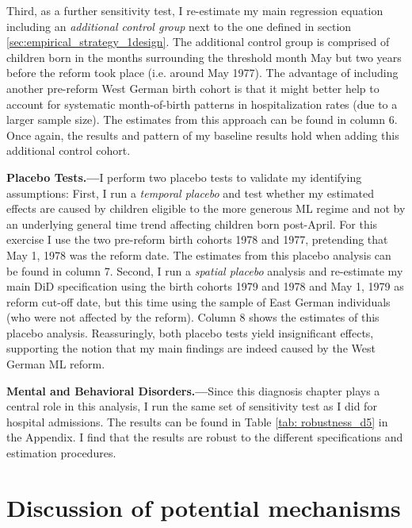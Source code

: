 \documentclass[11pt, a4paper, draft]{article} %
\begin{document}
Third, as a further sensitivity test, I re-estimate my main regression equation including an \textit{additional control group} next to the one defined in section \ref{sec:empirical_strategy_1design}. The additional control group is comprised of children born in the months surrounding the threshold month May but two years before the reform took place (i.e. around May 1977). The advantage of including another pre-reform West German birth cohort is that it might better help to account for systematic month-of-birth patterns in hospitalization rates (due to a larger sample size). The estimates from this approach can be found in column 6. Once again, the results and pattern of my baseline results hold when adding this additional control cohort.\newline


\textbf{Placebo Tests.---}I perform two placebo tests to validate my identifying assumptions: First, I run a \textit{temporal placebo} and test whether my estimated effects are caused by children eligible to the more generous ML regime and not by an underlying general time trend affecting children born post-April. For this exercise I use the two pre-reform birth cohorts 1978 and 1977, pretending that May 1, 1978 was the reform date. The estimates from this placebo analysis can be found in column 7. Second, I run a \textit{spatial placebo} analysis and re-estimate my main DiD specification using the birth cohorts 1979 and 1978 and May 1, 1979 as reform cut-off date, but this time using the sample of East German individuals (who were not affected by the reform). Column 8 shows the estimates of this placebo analysis. Reassuringly, both placebo tests yield insignificant effects, supporting the notion that my main findings are indeed caused by the West German ML reform.\newline


\textbf{Mental and Behavioral Disorders.---}Since this diagnosis chapter plays a central role in this analysis, I run the same set of sensitivity test as I did for hospital admissions. The results can be found in Table \ref{tab: robustness_d5} in the Appendix. I find that the results are robust to the different specifications and estimation procedures.




\bigskip
\section[Discussion]{Discussion of potential mechanisms}\label{sec:discussion}
\end{document}

